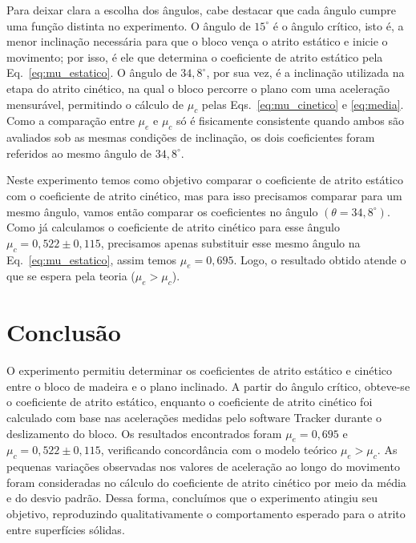 \documentclass[12pt,a4paper]{article}
\begin{document}
Para deixar clara a escolha dos ângulos, cabe destacar que cada ângulo
cumpre uma função distinta no experimento. O ângulo de \(15^\circ\) é o
ângulo crítico, isto é, a menor inclinação necessária para que o bloco
vença o atrito estático e inicie o movimento; por isso, é ele que
determina o coeficiente de atrito estático pela Eq.~\eqref{eq:mu_estatico}.
O ângulo de \(34,8^\circ\), por sua vez, é a inclinação utilizada na
etapa do atrito cinético, na qual o bloco percorre o plano com uma
aceleração mensurável, permitindo o cálculo de \(\mu_c\) pelas
Eqs.~\eqref{eq:mu_cinetico} e \eqref{eq:media}. Como a comparação entre
\(\mu_e\) e \(\mu_c\) só é fisicamente consistente quando ambos são
avaliados sob as mesmas condições de inclinação, os dois coeficientes
foram referidos ao mesmo ângulo de \(34,8^\circ\).

Neste experimento temos como objetivo comparar o coeficiente de atrito
estático com o coeficiente de atrito cinético, mas para isso precisamos
comparar para um mesmo ângulo, vamos então comparar os coeficientes no
ângulo \((\theta = 34,8^\circ)\). Como já calculamos o coeficiente de
atrito cinético para esse ângulo \(\mu_{c} = 0,522 \pm 0,115\),
precisamos apenas substituir esse mesmo ângulo na
Eq.~\eqref{eq:mu_estatico}, assim temos \(\mu_{e} = 0,695\). Logo, o
resultado obtido atende o que se espera pela teoria
(\(\mu_e > \mu_c\)).

\section{Conclusão}

O experimento permitiu determinar os coeficientes de atrito estático e
cinético entre o bloco de madeira e o plano inclinado. A partir do
ângulo crítico, obteve-se o coeficiente de atrito estático, enquanto o
coeficiente de atrito cinético foi calculado com base nas acelerações
medidas pelo software Tracker durante o deslizamento do bloco. Os
resultados encontrados foram \(\mu_{e} = 0,695\) e
\(\mu_{c} = 0,522 \pm 0,115\), verificando concordância com o modelo
teórico \(\mu_e > \mu_c\). As pequenas variações observadas nos valores
de aceleração ao longo do movimento foram consideradas no cálculo do
coeficiente de atrito cinético por meio da média e do desvio padrão.
Dessa forma, concluímos que o experimento atingiu seu objetivo,
reproduzindo qualitativamente o comportamento esperado para o atrito
entre superfícies sólidas.
\end{document}
